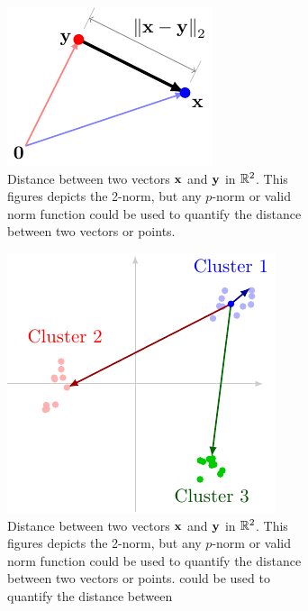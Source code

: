 \begin{figure}[h]
    \centering
    \begin{subfigure}[b]{0.35\textwidth}
        \includegraphics[width=0.95\linewidth]{figure/chapter01/dist-demo.pdf}
        \caption{Distance between two vectors $\mathbf{x}$ and $\mathbf{y}$ in $\mathbb{R}^2$. This figures depicts the 2-norm, but any $p$-norm or valid norm function could be used to quantify the distance between two vectors or points.}
        \label{fig:dist1}
    \end{subfigure}
    \hspace{0.05\textwidth}
    \begin{subfigure}[b]{0.4\textwidth}
        \centering
        \includegraphics[width=0.85\linewidth]{figure/chapter01/cluster-dist.pdf}
        \caption{Distance between two vectors $\mathbf{x}$ and $\mathbf{y}$ in $\mathbb{R}^2$. This figures depicts the 2-norm, but any $p$-norm or valid norm function could be used to quantify the distance between two vectors or points.  could be used to quantify the distance between}
        \label{fig:dist-clusters}
    \end{subfigure}
    \caption{}
\end{figure}

